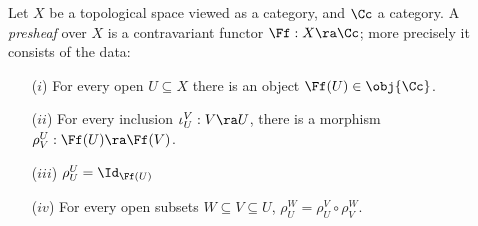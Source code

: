 \begin{defin*}
  Let $X$ be a topological space viewed as a category, and $\Cc$ a category. A \emph{presheaf}
  over $X$ is a contravariant functor $\Ff:X\ra\Cc$; more precisely it consists of the data:
  \begin{enumerate}
  \item[($i$)] For every open $U\subseteq X$ there is an object $\Ff(U)\in\obj{\Cc}$.
  \item[($ii$)] For every inclusion $\iota^V_U:V\ra U$, there is a morphism
    $\rho^U_V:\Ff(U)\ra\Ff(V)$.
  \item[($iii$)] $\rho^U_U=\Id_{\Ff(U)}$
  \item[($iv$)] For every open subsets $W\subseteq V\subseteq U$, $\rho^W_U=\rho^V_U\circ\rho^W_V$.
  \end{enumerate}
\end{defin*}